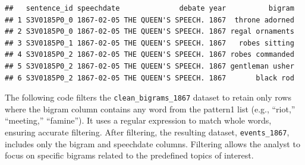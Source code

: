 \documentclass[
]{article}
\newenvironment{Shaded}{\begin{snugshade}}{\end{snugshade}}
\newcommand{\AttributeTok}[1]{\textcolor[rgb]{0.13,0.29,0.53}{#1}}
\newcommand{\CommentTok}[1]{\textcolor[rgb]{0.56,0.35,0.01}{\textit{#1}}}
\newcommand{\DecValTok}[1]{\textcolor[rgb]{0.00,0.00,0.81}{#1}}
\newcommand{\FunctionTok}[1]{\textcolor[rgb]{0.13,0.29,0.53}{\textbf{#1}}}
\newcommand{\NormalTok}[1]{#1}
\newcommand{\OtherTok}[1]{\textcolor[rgb]{0.56,0.35,0.01}{#1}}
\newcommand{\SpecialCharTok}[1]{\textcolor[rgb]{0.81,0.36,0.00}{\textbf{#1}}}
\newcommand{\StringTok}[1]{\textcolor[rgb]{0.31,0.60,0.02}{#1}}
\begin{document}
\begin{Shaded}
\end{Shaded}

\begin{verbatim}
##   sentence_id speechdate              debate year          bigram
## 1 S3V0185P0_0 1867-02-05 THE QUEEN'S SPEECH. 1867  throne adorned
## 2 S3V0185P0_0 1867-02-05 THE QUEEN'S SPEECH. 1867 regal ornaments
## 3 S3V0185P0_1 1867-02-05 THE QUEEN'S SPEECH. 1867   robes sitting
## 4 S3V0185P0_2 1867-02-05 THE QUEEN'S SPEECH. 1867 robes commanded
## 5 S3V0185P0_2 1867-02-05 THE QUEEN'S SPEECH. 1867 gentleman usher
## 6 S3V0185P0_2 1867-02-05 THE QUEEN'S SPEECH. 1867       black rod
\end{verbatim}

The following code filters the \texttt{clean\_bigrams\_1867} dataset to
retain only rows where the bigram column contains any word from the
pattern1 list (e.g., ``riot,'' ``meeting,'' ``famine''). It uses a
regular expression to match whole words, ensuring accurate filtering.
After filtering, the resulting dataset, \texttt{events\_1867}, includes
only the bigram and speechdate columns. Filtering allows the analyst to
focus on specific bigrams related to the predefined topics of interest.
\end{document}
